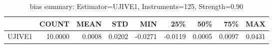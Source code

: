 \begin{table}[ht]
\centering
\caption{bias summary: Estimator=UJIVE1, Instruments=125, Strength=0.90}
\begin{tabular}{lrrrrrrrr}
\toprule
 & COUNT & MEAN & STD & MIN & 25\% & 50\% & 75\% & MAX \\
\midrule
UJIVE1 & 10.0000 & 0.0008 & 0.0202 & -0.0271 & -0.0119 & 0.0005 & 0.0097 & 0.0431 \\
\bottomrule
\end{tabular}
\end{table}
